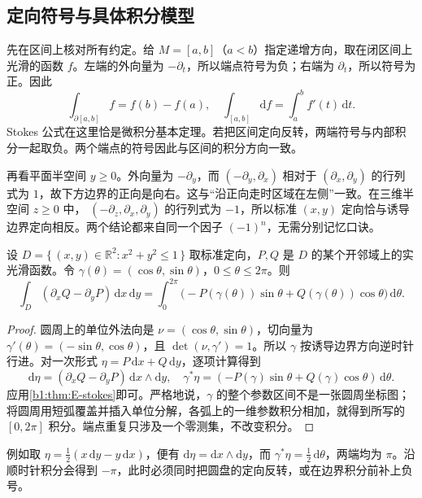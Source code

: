 \subsection{定向符号与具体积分模型}
\label{b1:subsec:E10404}

先在区间上核对所有约定。给 \(M=[a,b]\)（\(a<b\)）指定递增方向，取在闭区间上光滑的函数 \(f\)。左端的外向量为 \(-\partial_t\)，所以端点符号为负；右端为 \(\partial_t\)，所以符号为正。因此
\[
 \int_{\partial[a,b]}f=f(b)-f(a),\quad
 \int_{[a,b]}\mathrm df=\int_a^bf'(t)\,\mathrm dt.
\]
Stokes 公式在这里恰是微积分基本定理。若把区间定向反转，两端符号与内部积分一起取负。两个端点的符号因此与区间的积分方向一致。

\ProseParagraphBreak

再看平面半空间 \(y\geq0\)。外向量为 \(-\partial_y\)，而
\((-\partial_y,\partial_x)\) 相对于 \((\partial_x,\partial_y)\) 的行列式为 \(1\)，故下方边界的正向是向右。这与“沿正向走时区域在左侧”一致。在三维半空间 \(z\geq0\) 中，
\((-\partial_z,\partial_x,\partial_y)\) 的行列式为 \(-1\)，所以标准 \((x,y)\) 定向恰与诱导边界定向相反。两个结论都来自同一个因子 \((-1)^n\)，无需分别记忆口诀。

\begin{corollary}\label{b1:cor:E-green-disk}
设 \(D=\{\,(x,y)\in\mathbb R^2:x^2+y^2\leq1\,\}\) 取标准定向，\(P,Q\) 是 \(D\) 的某个开邻域上的实光滑函数。令
\(\gamma(\theta)=(\cos\theta,\sin\theta)\)，\(0\leq\theta\leq2\pi\)。则
\[
 \int_D(\partial_xQ-\partial_yP)\,\mathrm dx\,\mathrm dy
 =\int_0^{2\pi}
       \bigl(-P(\gamma(\theta))\sin\theta
                 +Q(\gamma(\theta))\cos\theta\bigr)\,\mathrm d\theta.
\]
\end{corollary}
\begin{proof}
圆周上的单位外法向是 \(\nu=(\cos\theta,\sin\theta)\)，切向量为
\(\gamma'(\theta)=(-\sin\theta,\cos\theta)\)，且
\(\det(\nu,\gamma')=1\)。所以 \(\gamma\) 按诱导边界方向逆时针行进。对一次形式
\(\eta=P\,\mathrm dx+Q\,\mathrm dy\)，逐项计算得到
\[
 \mathrm d\eta=(\partial_xQ-\partial_yP)\,
                       \mathrm dx\wedge\mathrm dy,\quad
 \gamma^*\eta=(-P(\gamma)\sin\theta+Q(\gamma)\cos\theta)
                                                    \,\mathrm d\theta.
\]
应用\cref{b1:thm:E-stokes}即可。严格地说，\(\gamma\) 的整个参数区间不是一张圆周坐标图；将圆周用短弧覆盖并插入单位分解，各弧上的一维参数积分相加，就得到所写的 \([0,2\pi]\) 积分。端点重复只涉及一个零测集，不改变积分。
\end{proof}

例如取 \(\eta=\frac12(x\,\mathrm dy-y\,\mathrm dx)\)，便有
\(\mathrm d\eta=\mathrm dx\wedge\mathrm dy\)，而
\(\gamma^*\eta=\frac12\,\mathrm d\theta\)，两端均为 \(\pi\)。沿顺时针积分会得到 \(-\pi\)，此时必须同时把圆盘的定向反转，或在边界积分前补上负号。

